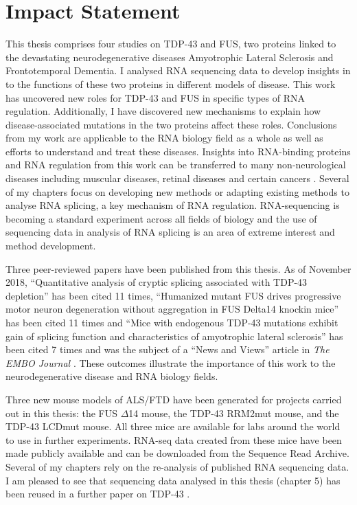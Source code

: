 
\cleardoublepage

\section*{Impact Statement}

This thesis comprises four studies on TDP-43 and FUS, two proteins linked to the devastating neurodegenerative diseases Amyotrophic Lateral Sclerosis and Frontotemporal Dementia.
I analysed RNA sequencing data to develop insights in to the functions of these two proteins in different models of disease.
This work has uncovered new roles for TDP-43 and FUS in specific types of RNA regulation.
Additionally, I have discovered new mechanisms to explain how disease-associated mutations in the two proteins affect these roles.
Conclusions from my work are applicable to the RNA biology field as a whole as well as efforts to understand and treat these diseases.
Insights into RNA-binding proteins and RNA regulation from this work can be transferred to many non-neurological diseases including muscular diseases, retinal diseases and certain cancers \citep{Scotti2015}. 
Several of my chapters focus on developing new methods or adapting existing methods to analyse RNA splicing, a key mechanism of RNA regulation.
RNA-sequencing is becoming a standard experiment across all fields of biology and the use of sequencing data in analysis of RNA splicing is an area of extreme interest and method development. 

Three peer-reviewed papers have been published from this thesis.
As of November 2018, ``Quantitative analysis of cryptic splicing associated with TDP-43 depletion'' \citep{Humphrey2017} has been cited 11 times, ``Humanized mutant FUS drives progressive motor neuron degeneration without aggregation in FUS Delta14 knockin mice'' \citep{Devoy2017} has been cited 11 times and ``Mice with endogenous TDP-43 mutations exhibit gain of splicing function and characteristics of amyotrophic lateral sclerosis'' \citep{Fratta2018} has been cited 7 times and was the subject of a ``News and Views'' article in \textit{The EMBO Journal} \citep{Rouaux2018}.
These outcomes illustrate the importance of this work to the neurodegenerative disease and RNA biology fields.

Three new mouse models of ALS/FTD have been generated for projects carried out in this thesis: the FUS $\Delta$14 mouse, the TDP-43 RRM2mut mouse, and the TDP-43 LCDmut mouse. 
All three mice are available for labs around the world to use in further experiments.
RNA-seq data created from these mice have been made publicly available and can be downloaded from the Sequence Read Archive\footnotemark.
Several of my chapters rely on the re-analysis of published RNA sequencing data. 
I am pleased to see that sequencing data analysed in this thesis (chapter 5) has been reused in a further paper on TDP-43 \citep{Sivakumar2018}.

